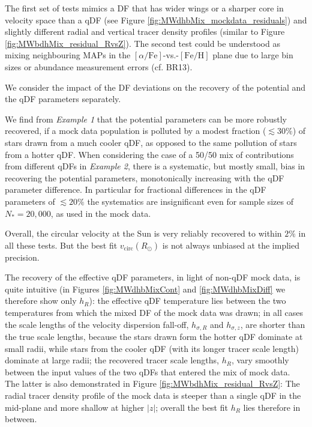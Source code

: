\documentclass[iop,revtex4,numberedappendix,appendixfloats]{emulateapj}
\newcommand{\MAPs}{MAPs}
\begin{document}
The first set of tests mimics a DF that has wider wings or a sharper core in velocity space than a qDF (see Figure \ref{fig:MWdhbMix_mockdata_residuals}) and slightly different radial and vertical tracer density profiles (similar to Figure \ref{fig:MWbdhMix_residual_RvsZ}). The second test could be understood as mixing neighbouring \MAPs{} in the $[\alpha/\mathrm{Fe}]$-vs.-$[\mathrm{Fe}/\mathrm{H}]$ plane due to large bin sizes or abundance measurement errors (cf. BR13). 

We consider the impact of the DF deviations on the recovery of the potential and the qDF parameters separately. 

We find from \emph{Example 1} that the potential parameters can be more robustly recovered, if a mock data population is polluted by a modest fraction ($\lesssim 30\%$) of stars drawn from a much cooler qDF, as opposed to the same pollution of stars from a hotter qDF. When considering the case of a 50/50 mix of contributions from different qDFs in \emph{Example 2}, there is a systematic, but mostly small, bias in recovering the potential parameters, monotonically increasing with the qDF parameter difference. In particular for fractional differences in the qDF parameters of $\lesssim 20\%$ the systematics are insignificant even for sample sizes of $N_{*} = 20,000$, as used in the mock data.

Overall, the circular velocity at the Sun is very reliably recovered to within $2\%$ in all these tests. But the best fit $v_\text{circ}(R_\odot)$ is not always unbiased at the implied precision.

The recovery of the effective qDF parameters, in light of non-qDF mock data, is quite intuitive (in Figures \ref{fig:MWdhbMixCont} and \ref{fig:MWdhbMixDiff} we therefore show only $h_R$): the effective qDF temperature lies between the two temperatures from which the mixed DF of the mock data was drawn; in all cases the scale lengths of the velocity dispersion fall-off, $h_{\sigma,R}$ and $h_{\sigma,z}$, are shorter than the true scale lengths, because the stars drawn form the hotter qDF dominate at small radii, while stars from the cooler qDF (with its longer tracer scale length) dominate at large radii; the recovered tracer scale lengths, $h_R$, vary smoothly between the input values of the two qDFs that entered the mix of mock data. The latter is also demonstrated in Figure \ref{fig:MWbdhMix_residual_RvsZ}: The radial tracer density profile of the mock data is steeper than a single qDF in the mid-plane and more shallow at higher $|z|$; overall the best fit $h_R$ lies therefore in between.
\end{document}
